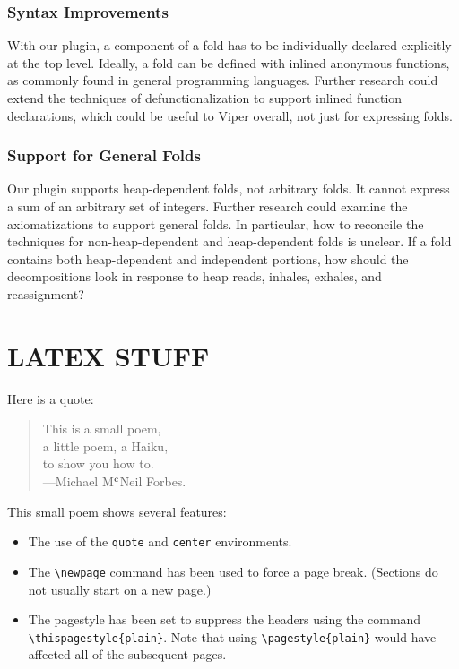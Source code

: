 \documentclass[msc,oneside]{ubcthesis}
\theoremstyle{definition}
\begin{document}
\subsection{Syntax Improvements}
With our plugin, a component of a fold has to be individually declared explicitly at the top level. Ideally, a fold can be defined with inlined anonymous functions, as commonly found in general programming languages. Further research could extend the techniques of defunctionalization to support inlined function declarations, which could be useful to Viper overall, not just for expressing folds.  

\subsection{Support for General Folds}
Our plugin supports heap-dependent folds, not arbitrary folds. It cannot express a sum of an arbitrary set of integers. Further research could examine the axiomatizations to support general folds. In particular, how to reconcile the techniques for non-heap-dependent and heap-dependent folds is unclear. If a fold contains both heap-dependent and independent portions, how should the decompositions look in response to heap reads, inhales, exhales, and reassignment? 

\chapter{LATEX STUFF}

Here is a quote:
\begin{quote}
  \begin{center}
    This is a small poem,\\
    a little poem, a Haiku,\\
    to show you how to.\\
    ---Michael M$^{\rm c}$Neil Forbes.
  \end{center}
\end{quote}

This small poem shows several features:
\begin{itemize}
\item The use of the \verb|quote| and \verb|center| environments.
\item The \verb|\newpage| command has been used to force a page
  break.  (Sections do not usually start on a new page.)
\item The pagestyle has been set to suppress the headers using the
  command \verb|\thispagestyle{plain}|.  Note that using
  \verb|\pagestyle{plain}| would have affected all of the subsequent
  pages.
\end{itemize}
\end{document}
